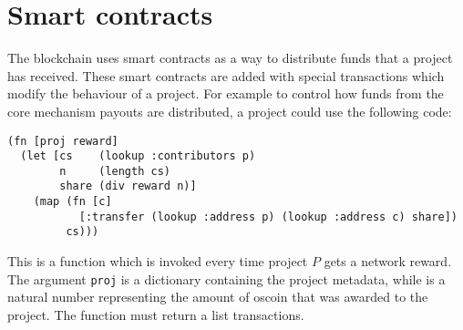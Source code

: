 \section{Smart contracts}

The \oscoin{} blockchain uses smart contracts as a way to distribute funds that
a project has received. These smart contracts are added with special
transactions which modify the behaviour of a project. For example to control how
funds from the core mechanism payouts are distributed, a project could use the
following code:

\begin{lstlisting}
(fn [proj reward]
  (let [cs    (lookup :contributors p)
        n     (length cs)
        share (div reward n)]
    (map (fn [c]
           [:transfer (lookup :address p) (lookup :address c) share])
         cs)))
\end{lstlisting}

This is a function which is invoked every time project $P$ gets a network
reward. The argument \texttt{proj} is a dictionary containing the project
metadata, while  is a natural number representing the amount of
oscoin that was awarded to the project. The function must return a list
transactions.
